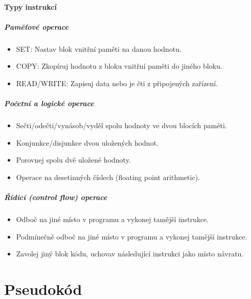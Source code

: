 \documentclass[aspectratio=169,11pt,handout]{beamer}
\begin{document}
\subsection[Instrukce]{Typy instrukcí}

\begin{frame}
 \frametitle{Paměťové operace}
 \begin{itemize}
  \item<1-> \alert{SET}: Nastav blok vnitřní paměti na danou hodnotu.
  \item<2-> \alert{COPY}: Zkopíruj hodnotu z bloku vnitřní paměti do jiného bloku.
  \item<3-> \alert{READ/WRITE}: Zapisuj data nebo je čti z připojených zařízení.
 \end{itemize}
\end{frame}

\begin{frame}
 \frametitle{Početní a logické operace}
 \begin{itemize}
  \item<1-> \alert{Sečti/odečti/vynásob/vyděl} spolu hodnoty ve dvou blocích
   paměti.
  \item<2-> \alert{Konjunkce/disjunkce} dvou uložených hodnot.
  \item<3-> \alert{Porovnej} spolu dvě uložené hodnoty.
  \item<4-> Operace na desetinných číslech (\alert{floating point} arithmetic).
 \end{itemize}
\end{frame}

\begin{frame}
 \frametitle{Řídící (control flow) operace}
 \begin{itemize}
  \item<1-> \alert{Odboč} na jiné místo v programu a vykonej tamější instrukce.
  \item<2-> \alert{Podmínečně odboč} na jiné místo v programu a vykonej tamější
   instrukce.
  \item<3-> \alert{Zavolej} jiný blok kódu, uchovav následující instrukci jako
   místo návratu.
 \end{itemize}
\end{frame}

\part[Pseudokód]{Pseudokód}

\begin{frame}
 \partpage
\end{frame}
\end{document}
